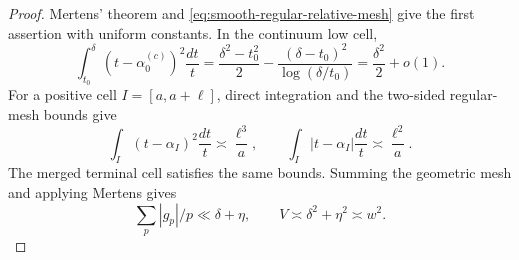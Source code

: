 \documentclass[11pt]{article}
\numberwithin{equation}{section}
\theoremstyle{definition}
\theoremstyle{remark}
\newcommand{\1}{\mathbf 1}
\begin{document}
\begin{proof}
Mertens' theorem and
\eqref{eq:smooth-regular-relative-mesh} give the first assertion with
uniform constants.  In the continuum low cell,
\begin{equation}
 \int_{t_0}^{\delta}(t-\alpha_0^{(c)})^2\frac{dt}{t}
 =\frac{\delta^2-t_0^2}{2}
       -\frac{(\delta-t_0)^2}{\log(\delta/t_0)}
 =\frac{\delta^2}{2}+o(1).
 \label{eq:smooth-low-V-constant}
\end{equation}
For a positive cell \(I=[a,a+\ell]\), direct integration and the
two-sided regular-mesh bounds give
\begin{equation}
 \int_I(t-\alpha_I)^2\frac{dt}{t}
       \asymp\frac{\ell^3}{a},\qquad
 \int_I|t-\alpha_I|\frac{dt}{t}\asymp\frac{\ell^2}{a}.
 \label{eq:smooth-positive-cell-moments}
\end{equation}
The merged terminal cell satisfies the same bounds.  Summing the
geometric mesh and applying Mertens gives
\[
 \sum_p|g_p|/p\ll\delta+\eta,\qquad
 V\asymp\delta^2+\eta^2\asymp w^2.
\]


\end{proof}
\end{document}
